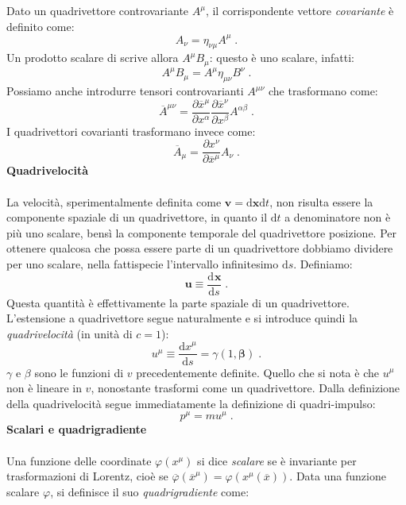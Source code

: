 \documentclass[12pt,a4paper]{report}
\theoremstyle{definition}
\newcommand{\dev}[3][]{\frac{\mathrm{d}^{#1} #2}{\mathrm{d} #3^{#1}}}
\newcommand{\diff}[1][]{\mathrm{d}#1}
\begin{document}
Dato un quadrivettore controvariante $A^{\mu}$, il corrispondente vettore \emph{covariante} è definito come:
\begin{equation}
A_{\nu}=\eta_{\nu\mu}A^{\mu}\;.
\end{equation}
Un prodotto scalare di scrive allora $A^{\mu}B_{\mu}$: questo è uno scalare, infatti:
$$
A^{\mu}B_{\mu}=A^{\mu}\eta_{\mu\nu}B^{\nu}\;.
$$
Possiamo anche introdurre tensori controvarianti $A^{\mu\nu}$ che trasformano come:
\begin{equation}
\overline{A}^{\mu\nu}=\frac{\partial\overline{x}^{\mu}}{\partial x^{\alpha}}\frac{\partial \overline{x}^{\nu}}{\partial x^{\beta}}A^{\alpha\beta}\;.
\end{equation}
I quadrivettori covarianti trasformano invece come:
\begin{equation}
\overline{A}_{\mu}=\frac{\partial x^{\nu}}{\partial\overline{x}^{\mu}}A_{\nu}\;.
\end{equation}
\textbf{Quadrivelocità} \\
\\
La velocità, sperimentalmente definita come $\mathbf{v}=\diff{\mathbf{x}}{\diff{t}}$, non risulta essere la componente spaziale di un quadrivettore, in quanto il $\diff{t}$ a denominatore non è più uno scalare, bensì la componente temporale del quadrivettore posizione. Per ottenere qualcosa che possa essere parte di un quadrivettore dobbiamo dividere per uno scalare, nella fattispecie l'intervallo infinitesimo $\diff{s}$. Definiamo:
\begin{equation*}
\mathbf{u}\equiv \dev{\mathbf{x}}{s}\;.
\end{equation*}
Questa quantità è effettivamente la parte spaziale di un quadrivettore. L'estensione a quadrivettore segue naturalmente e si introduce quindi la \emph{quadrivelocità} (in unità di $c=1$):
\begin{equation}
u^{\mu}\equiv \frac{\diff{x^{\mu}}}{\diff{s}}=\gamma(1,\boldsymbol{\beta})\;.
\end{equation}
$\gamma$ e $\beta$ sono le funzioni di $v$ precedentemente definite. Quello che si nota è che $u^{\mu}$ non è lineare in $v$, nonostante trasformi come un quadrivettore. Dalla definizione della quadrivelocità segue immediatamente la definizione di quadri-impulso:
\begin{equation}
p^{\mu}=m u^{\mu}\;.
\end{equation}
\textbf{Scalari e quadrigradiente} \\
\\
Una funzione delle coordinate $\varphi(x^{\mu})$ si dice \emph{scalare} se è invariante per trasformazioni di Lorentz, cioè se $\overline{\varphi}(\overline{x}^{\mu})=\varphi(x^{\mu}(\overline{x}))$. Data una funzione scalare $\varphi$, si definisce il suo \emph{quadrigradiente} come:
\end{document}
